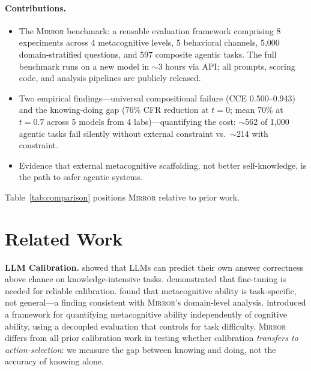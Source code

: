 \documentclass[10pt]{article}
\newcommand{\mirror}{\textsc{Mirror}}
\newcommand{\CCE}{CCE}
\newcommand{\CFR}{CFR}
\begin{document}
\paragraph{Contributions.}
\begin{itemize}
  \setlength\itemsep{2pt}
  \item The \mirror{} benchmark: a reusable evaluation framework comprising
        8 experiments across 4 metacognitive levels, 5 behavioral channels, 5,000
        domain-stratified questions, and 597 composite agentic tasks. The full
        benchmark runs on a new model in $\sim$3 hours via API; all prompts,
        scoring code, and analysis pipelines are publicly released.
  \item Two empirical findings---universal compositional failure
        (\CCE{} 0.500--0.943) and the knowing-doing gap (76\% \CFR{}
        reduction at $t\!=\!0$; mean 70\% at $t\!=\!0.7$ across 5 models from 4 labs)---quantifying the cost:
        $\sim$562 of 1,000 agentic tasks fail silently without external
        constraint vs.\ $\sim$214 with constraint.
  \item Evidence that external metacognitive scaffolding, not better
        self-knowledge, is the path to safer agentic systems.
\end{itemize}

Table~\ref{tab:comparison} positions \mirror{} relative to prior work.



\section{Related Work}
\label{sec:related}

\textbf{LLM Calibration.}
\citet{kadavath2022language} showed that LLMs can predict their own answer
correctness above chance on knowledge-intensive tasks.
\citet{kapoor2024calibration} demonstrated that fine-tuning is needed for reliable
calibration. \citet{steyvers2025calibration} found that metacognitive ability is
task-specific, not general---a finding consistent with \mirror{}'s domain-level
analysis. \citet{wang2025decoupling} introduced a framework for quantifying
metacognitive ability independently of cognitive ability, using a decoupled
evaluation that controls for task difficulty. \mirror{} differs from all prior calibration work in testing whether
calibration \textit{transfers to action-selection}: we measure the gap between
knowing and doing, not the accuracy of knowing alone.
\end{document}
